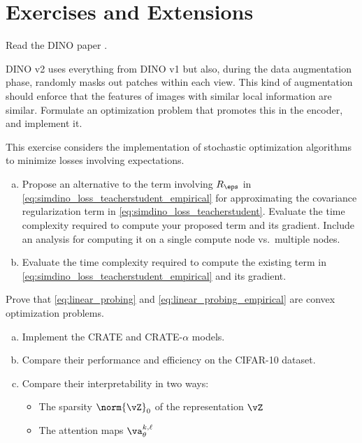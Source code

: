 \documentclass[../../book-main.tex]{subfiles}
\begin{document}
\section{Exercises and Extensions}

\begin{exercise}
Read the DINO paper \cite{caron2021emerging}.
\end{exercise}

\begin{exercise}
DINO v2 \cite{oquab2023dinov2} uses everything from DINO v1 but also,
during the data augmentation phase, randomly masks out patches within
each view. This kind of augmentation should enforce that the features
of images with similar local information are similar. Formulate an
optimization problem that promotes this in the encoder, and implement it.
\end{exercise}

\begin{exercise}
This exercise considers the implementation of stochastic optimization
algorithms to minimize losses involving expectations.
\begin{enumerate}[(a)]
\item Propose an alternative to the term involving \(R_{\eps}\) in
\eqref{eq:simdino_loss_teacherstudent_empirical} for
approximating the covariance regularization term in
\eqref{eq:simdino_loss_teacherstudent}. Evaluate the time
complexity required to compute your proposed term and its
gradient. Include an analysis for computing it on a single
compute node vs.~multiple nodes.
\item Evaluate the time complexity required to compute the existing
term in \eqref{eq:simdino_loss_teacherstudent_empirical} and its gradient.
\end{enumerate}
\end{exercise}

\begin{exercise}
Prove that \eqref{eq:linear_probing} and
\eqref{eq:linear_probing_empirical} are convex optimization problems.
\end{exercise}

\begin{exercise}
\phantom{}
\begin{enumerate}[(a)]
\item Implement the CRATE and CRATE-\(\alpha\) models.
\item Compare their performance and efficiency on the CIFAR-10 dataset.
\item Compare their interpretability in two ways:
\begin{itemize}
    \item The sparsity \(\norm{\vZ}_{0}\) of the representation \(\vZ\)
    \item The attention maps \(\va_{\theta}^{k, \ell}\)
\end{itemize}
\end{enumerate}
\end{exercise}
\end{document}
